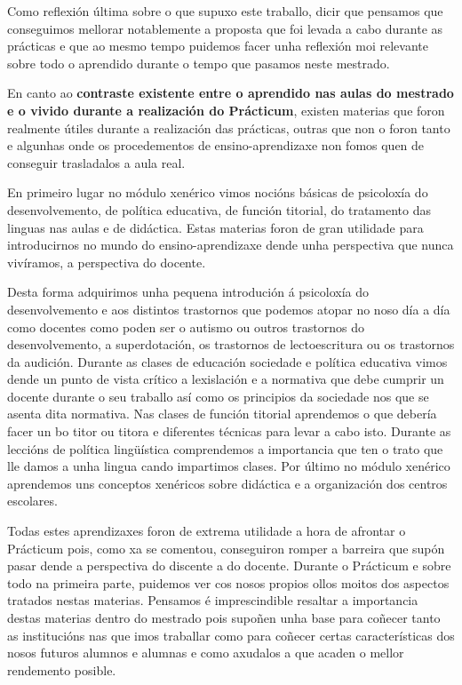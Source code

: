 Como reflexión última sobre o que supuxo este traballo, dicir que pensamos que conseguimos mellorar notablemente a proposta que foi levada a cabo durante as prácticas e que ao mesmo tempo puidemos facer unha reflexión moi relevante sobre todo o aprendido durante o tempo que pasamos neste mestrado.

En canto ao \textbf{contraste existente entre o aprendido nas aulas do mestrado e o vivido durante a realización do Prácticum}, existen materias que foron realmente útiles durante a realización das prácticas, outras que non o foron tanto e algunhas onde os procedementos de ensino-aprendizaxe non fomos quen de conseguir trasladalos a aula real.

En primeiro lugar no módulo xenérico vimos nocións básicas de psicoloxía do desenvolvemento, de política educativa, de función titorial, do tratamento das linguas nas aulas e de didáctica. Estas materias foron de gran utilidade para introducirnos no mundo do ensino-aprendizaxe dende unha perspectiva que nunca vivíramos, a perspectiva do docente.

Desta forma adquirimos unha pequena introdución á psicoloxía do desenvolvemento e aos distintos trastornos que podemos atopar no noso día a día como docentes como poden ser o autismo ou outros trastornos do desenvolvemento, a superdotación, os trastornos de lectoescritura ou os trastornos da audición. Durante as clases de educación sociedade e política educativa vimos dende un punto de vista crítico a lexislación e a normativa que debe cumprir un docente durante o seu traballo así como os principios da sociedade nos que se asenta dita normativa. Nas clases de función titorial aprendemos o que debería facer un bo titor ou titora e diferentes técnicas para levar a cabo isto. Durante as leccións de política lingüística comprendemos a importancia que ten o trato que lle damos a unha lingua cando impartimos clases. Por último no módulo xenérico aprendemos uns conceptos xenéricos sobre didáctica e a organización dos centros escolares.

Todas estes aprendizaxes foron de extrema utilidade a hora de afrontar o Prácticum pois, como xa se comentou, conseguiron romper a barreira que supón pasar dende a perspectiva do discente a do docente. Durante o Prácticum e sobre todo na primeira parte, puidemos ver cos nosos propios ollos moitos dos aspectos tratados nestas materias. Pensamos é imprescindible resaltar a importancia destas materias dentro do mestrado pois supoñen unha base para coñecer tanto as institucións nas que imos traballar como para coñecer certas características dos nosos futuros alumnos e alumnas e como axudalos a que acaden o mellor rendemento posible.

